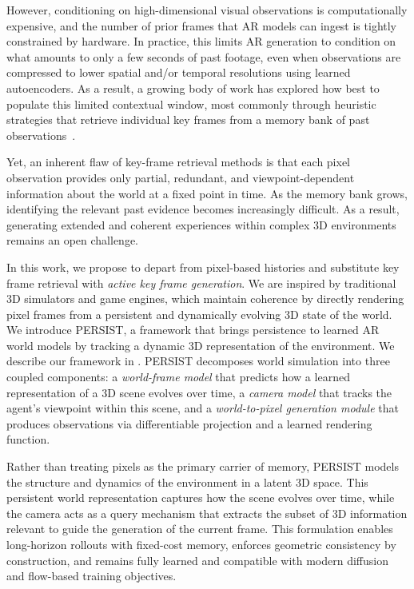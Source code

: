 However, conditioning on high-dimensional visual observations is computationally expensive, and the number of prior frames that AR models can ingest is tightly constrained by hardware.
In practice, this limits AR generation to condition on what amounts to only a few seconds of past footage, even when observations are compressed to lower spatial and/or temporal resolutions using learned autoencoders.
As a result, a growing body of work has explored how best to populate this limited contextual window, most commonly through heuristic strategies that retrieve individual key frames from a memory bank of past observations~\citep{xiao2025worldmem,huang2025memory}.

Yet, an inherent flaw of key-frame retrieval methods is that each pixel observation provides only partial, redundant, and viewpoint-dependent information about the world at a fixed point in time.
As the memory bank grows, identifying the relevant past evidence becomes increasingly difficult.
As a result, generating extended and coherent experiences within complex 3D environments remains an open challenge.%

In this work, we propose to depart from pixel-based histories and substitute key frame retrieval with \textit{active key frame generation}.
We are inspired by traditional 3D simulators and game engines, which maintain coherence by directly rendering pixel frames from a persistent and dynamically evolving 3D state of the world. We introduce PERSIST, a framework that brings persistence to learned AR world models by tracking a dynamic 3D representation of the environment. We describe our framework in .
PERSIST decomposes world simulation into three coupled components: a \textit{world-frame model} that predicts how a learned representation of a 3D scene evolves over time, a \textit{camera model} that tracks the agent’s viewpoint within this scene, and a \textit{world-to-pixel generation module} that produces observations via differentiable projection and a learned rendering function.

Rather than treating pixels as the primary carrier of memory, PERSIST models the structure and dynamics of the environment in a latent 3D space.
This persistent world representation captures how the scene evolves over time, while the camera acts as a query mechanism that extracts the subset of 3D information relevant to guide the generation of the current frame.
This formulation enables long-horizon rollouts with fixed-cost memory, enforces geometric consistency by construction, and remains fully learned and compatible with modern diffusion and flow-based training objectives.

